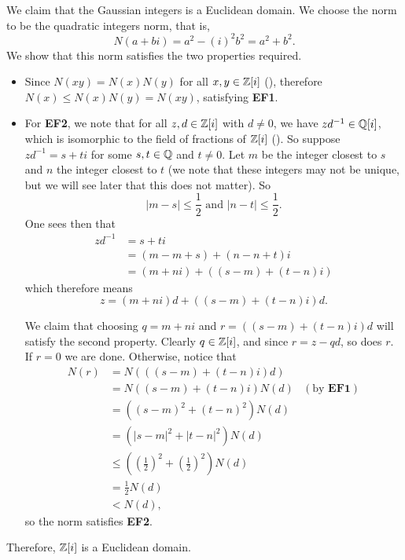 \begin{example}\label{example-gaussian-integers-is-euclidean-domain}
    We claim that the Gaussian integers is a Euclidean domain. We choose the norm to be the quadratic integers norm, that is,
    \[
        N(a+bi) = a^2 - (i)^2b^2 = a^2+b^2.
    \]
    We show that this norm satisfies the two properties required.
    \begin{itemize}
        \item Since $N(xy) = N(x)N(y)$ for all $x,y \in \mathbb{Z}[i]$ (), therefore $N(x) \leq N(x)N(y) = N(xy)$, satisfying \textbf{EF1}.
        
        \item For \textbf{EF2}, we note that for all $z, d \in \mathbb{Z}[i]$ with $d \neq 0$, we have $zd^{-1} \in \mathbb{Q}[i]$, which is isomorphic to the field of fractions of $\mathbb{Z}[i]$ (). So suppose $zd^{-1} = s + ti$ for some $s,t \in \mathbb{Q}$ and $t \neq 0$. Let $m$ be the integer closest to $s$ and $n$ the integer closest to $t$ (we note that these integers may not be unique, but we will see later that this does not matter). So
        \[
            |m - s| \leq \frac12 \text{ and } |n - t| \leq \frac12.
        \]
        One sees then that
        \begin{align*}
            zd^{-1} &= s + ti\\
            &= (m - m + s) + (n - n + t)i\\
            &= (m+ni) + \left((s-m) + (t-n)i\right)
        \end{align*}
        which therefore means
        \[
            z = (m+ni)d + \left((s-m) + (t-n)i\right)d.
        \]

        We claim that choosing $q = m + ni$ and $r = \left((s-m) + (t-n)i\right)d$ will satisfy the second property. Clearly $q \in \mathbb{Z}[i]$, and since $r = z - qd$, so does $r$. If $r = 0$ we are done. Otherwise, notice that
        \begin{align*}
            N(r) &= N\left(\left((s-m) + (t-n)i\right)d\right)\\
            &= N((s-m) + (t-n)i)N(d) & (\text{by }\textbf{EF1})\\
            &= \left((s-m)^2 + (t-n)^2\right) N(d)\\
            &= \left(|s-m|^2 + |t-n|^2\right) N(d)\\
            &\leq \left(\left(\frac12\right)^2 + \left(\frac12\right)^2\right)N(d)\\
            &= \frac12 N(d)\\
            &< N(d),
        \end{align*}
        so the norm satisfies \textbf{EF2}.
    \end{itemize}
    Therefore, $\mathbb{Z}[i]$ is a Euclidean domain.
\end{example}

